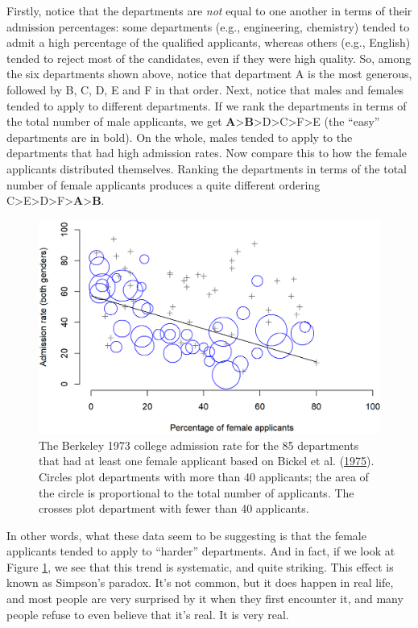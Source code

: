 \documentclass[
  11pt,
]{book}
\theoremstyle{indenteddefinition}
\theoremstyle{indenteddefinition}
\theoremstyle{definition}
\theoremstyle{definition}
\theoremstyle{remark}
\begin{document}
Firstly, notice that the departments are \emph{not} equal to one another in terms of their admission percentages: some departments (e.g., engineering, chemistry) tended to admit a high percentage of the qualified applicants, whereas others (e.g., English) tended to reject most of the candidates, even if they were high quality. So, among the six departments shown above, notice that department A is the most generous, followed by B, C, D, E and F in that order. Next, notice that males and females tended to apply to different departments. If we rank the departments in terms of the total number of male applicants, we get \textbf{A}\textgreater{}\textbf{B}\textgreater D\textgreater C\textgreater F\textgreater E (the ``easy'' departments are in bold). On the whole, males tended to apply to the departments that had high admission rates. Now compare this to how the female applicants distributed themselves. Ranking the departments in terms of the total number of female applicants produces a quite different ordering C\textgreater E\textgreater D\textgreater F\textgreater{}\textbf{A}\textgreater{}\textbf{B}.



\begin{figure}[h]

{\centering \includegraphics[width=0.66\linewidth]{resources/image/berkeley} 

}

\caption[The Berkeley 1973 college admissions data.]{The Berkeley 1973 college admission rate for the 85 departments that had at least one female applicant based on Bickel et al. (\protect\hyperlink{ref-Bickel1975}{1975}). Circles plot departments with more than 40 applicants; the area of the circle is proportional to the total number of applicants. The crosses plot department with fewer than 40 applicants.}\label{fig:berkeley}
\end{figure}

In other words, what these data seem to be suggesting is that the female applicants tended to apply to ``harder'' departments. And in fact, if we look at Figure \ref{fig:berkeley}, we see that this trend is systematic, and quite striking. This effect is known as Simpson's paradox. It's not common, but it does happen in real life, and most people are very surprised by it when they first encounter it, and many people refuse to even believe that it's real. It is very real.
\end{document}
